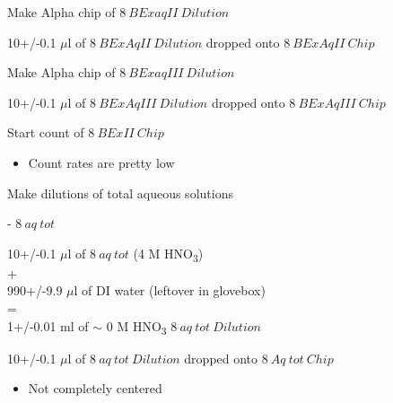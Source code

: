 \documentclass[idxtotoc,hyperref,openany,oneside]{labbook} %
\newcommand{\cmark}{\ding{51}}%
\newcommand{\done}{\rlap{$\square$}{\raisebox{2pt}{\large\hspace{1pt}\cmark}}%
  \hspace{-2.5pt}}
\newcommand{\tsbs}{\textsubscript}
\begin{document}
\begin{todolist}
\item[\done]{Make Alpha chip of $\boxed{8\ BExaqII\ Dilution}$}
\begin{center}
  10+/-0.1 $\mu$l of $\boxed{8\ BExAqII\ Dilution}$ dropped onto
  $\boxed{8\ BExAqII\ Chip}$
\end{center}
\item[\done]{Make Alpha chip of $\boxed{8\ BExaqIII\ Dilution}$}
\begin{center}
  10+/-0.1 $\mu$l of $\boxed{8\ BExAqIII\ Dilution}$ dropped onto
  $\boxed{8\ BExAqIII\ Chip}$
\end{center}
\item[\done]{Start count of $\boxed{8\ BExII\ Chip}$}
  \begin{itemize}
  \item{Count rates are pretty low}
  \end{itemize}
\item[\done]{Make dilutions of total aqueous solutions}
  \begin{todolist}
  \item[\done]{- $\boxed{8\ aq\ tot}$}
  \end{todolist}
  \begin{center}
    10+/-0.1 $\mu$l of $\boxed{8\ aq\ tot}$
    (4 M HNO\tsbs{3})\\
    +\\
    990+/-9.9 $\mu$l of DI water (leftover in glovebox)\\
  =\\
  1+/-0.01 ml of $\sim$
  0 M HNO\tsbs{3} $\boxed{8\ aq\ tot\ Dilution}$
\end{center}
\begin{center}
  10+/-0.1 $\mu$l of $\boxed{8\ aq\ tot\ Dilution}$ dropped onto
  $\boxed{8\ Aq\ tot\ Chip}$
\end{center}
\begin{itemize}
\item{Not completely centered}
\end{itemize}


\end{todolist}
\end{document}
